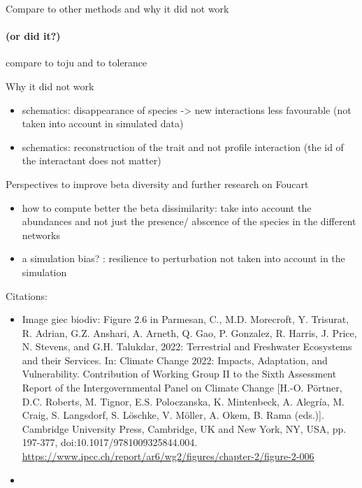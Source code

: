 \documentclass{beamer}
\begin{document}
\begin{frame}{Compare to other methods and why it did not work}
  \framesubtitle{(or did it?)}
  compare to toju and to tolerance
\end{frame}

\begin{frame}{Why it did not work}
\begin{itemize}
\item
  schematics: disappearance of species -\textgreater{} new interactions
  less favourable (not taken into account in simulated data)
\item
  schematics: reconstruction of the trait and not profile interaction
  (the id of the interactant does not matter)
\end{itemize}
\end{frame}

\begin{frame}{Perspectives to improve beta diversity and further
research on Foucart}
\protect\hypertarget{perspectives-to-improve-beta-diversity-and-further-research-on-foucart}{}
\begin{itemize}
\item
  how to compute better the beta dissimilarity: take into account the
  abundances and not just the presence/ abscence of the species in the
  different networks
\item
  a simulation bias? : resilience to perturbation not taken into account
  in the simulation
\end{itemize}
\end{frame}

\begin{frame}{Citations:}
\protect\hypertarget{citations}{}
\begin{itemize}
\item
  Image giec biodiv: Figure 2.6 in Parmesan, C., M.D. Morecroft, Y.
  Trisurat, R. Adrian, G.Z. Anshari, A. Arneth, Q. Gao, P. Gonzalez, R.
  Harris, J. Price, N. Stevens, and G.H. Talukdar, 2022: Terrestrial and
  Freshwater Ecosystems and their Services. In: Climate Change 2022:
  Impacts, Adaptation, and Vulnerability. Contribution of Working Group
  II to the Sixth Assessment Report of the Intergovernmental Panel on
  Climate Change {[}H.-O. Pörtner, D.C. Roberts, M. Tignor, E.S.
  Poloczanska, K. Mintenbeck, A. Alegría, M. Craig, S. Langsdorf, S.
  Löschke, V. Möller, A. Okem, B. Rama (eds.){]}. Cambridge University
  Press, Cambridge, UK and New York, NY, USA, pp. 197-377,
  doi:10.1017/9781009325844.004.
  \href{https://www.ipcc.ch/report/ar6/wg2/figures/chapter-2/figure-2-006}{https://www.ipcc.ch/report/ar6/wg2/figures/chapter-2/figure-2-006}
\item
\end{itemize}
\end{frame}
\end{document}
